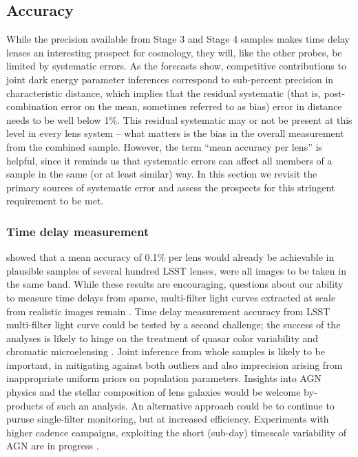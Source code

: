 \subsection{Accuracy}
\label{ssec:accuracy}

While the precision available from Stage 3 and Stage 4 samples makes
time delay lenses an interesting prospect for cosmology, they will,
like the other probes, be limited by systematic errors. As the
forecasts show, competitive contributions to joint dark energy
parameter inferences correspond to sub-percent precision in
characteristic distance, which implies that the residual systematic
(that is, post-combination error on the mean, sometimes referred to as
bias) error in distance needs to be well below 1\%. This residual
systematic may or not be present at this level in every lens system --
what matters is the bias in the overall measurement from the combined
sample. However, the term ``mean accuracy per lens'' is helpful, since
it reminds us that systematic errors can affect all members of a sample
in the same (or at least similar) way.  In
this section we revisit the primary sources of systematic error and
assess the prospects for this stringent requirement to be met.

\subsubsection{Time delay measurement}

\citet{LiaoEtal2015} showed that a
mean accuracy of 0.1\% per lens would already be achievable in
plausible samples of several hundred LSST lenses, were all images to
be taken in the same band.  While these results are encouraging,
questions about our ability to measure time delays from sparse,
multi-filter light curves extracted at scale from realistic images
remain \citep{TCM13}.  Time delay measurement accuracy from LSST
multi-filter light curve could be tested by a second challenge; the
success of the analyses is likely to hinge on the treatment of quasar
color variability \citep[see e.g.\ ][and references
therein]{Sch++12,SunEtal2014} and chromatic microelensing
\citep[see e.g.][and references therein]{HainlineEtal2013}.
Joint inference from whole samples is likely to
be important, in mitigating against both outliers and also imprecision
arising from inappropriate uniform priors on  population parameters.
Insights into AGN physics and the stellar composition  of lens galaxies
would be welcome by-products of such an analysis. An alternative approach
could be to continue to puruse single-filter monitoring, but at
increased efficiency. Experiments with higher cadence campaigns,
exploiting the short (sub-day) timescale variability of AGN are in
progress \citep[][F.~Courbin, priv.\ comm.]{BorosonEtal2016}.

